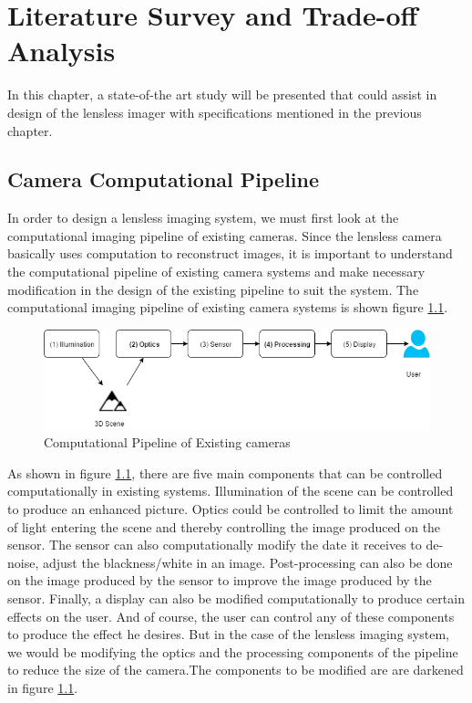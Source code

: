 \chapter{Literature Survey and Trade-off Analysis}
\label{chp:LitSurvey}
In this chapter, a state-of-the art study will be presented that could assist in design of the lensless imager with specifications mentioned in the previous chapter.
\section{Camera Computational Pipeline}
In order to design a lensless imaging system, we must first look at the computational imaging pipeline of existing cameras. Since the lensless camera basically uses computation to reconstruct images, it is important to understand the computational pipeline of existing camera systems and make necessary modification in the design of the existing pipeline to suit the system. The computational imaging pipeline of existing camera systems is shown figure \ref{fig:CompPipeline}\cite{CompPipeline}.
\begin{figure}[htb]
\includegraphics[width=\textwidth]{pics/CompPipeline}
\caption{Computational Pipeline of Existing cameras}
\label{fig:CompPipeline}
\end{figure}
As shown in figure \ref{fig:CompPipeline}, there are five main components that can be controlled computationally in existing systems. Illumination of the scene can be controlled to produce an enhanced picture. Optics could be controlled to limit the amount of light entering the scene and thereby controlling the image produced on the sensor. The sensor can also computationally modify the date it receives to de-noise, adjust the blackness/white in an image. Post-processing can also be done on the image produced by the sensor to improve the image produced by the sensor. Finally, a display can also be modified computationally to produce certain effects on the user. And of course, the user can control any of these components to produce the effect he desires. But in the case of the lensless imaging system, we would be modifying the optics and the processing components of the pipeline to reduce the size of the camera.The components to be modified are are darkened in figure \ref{fig:CompPipeline}. 

